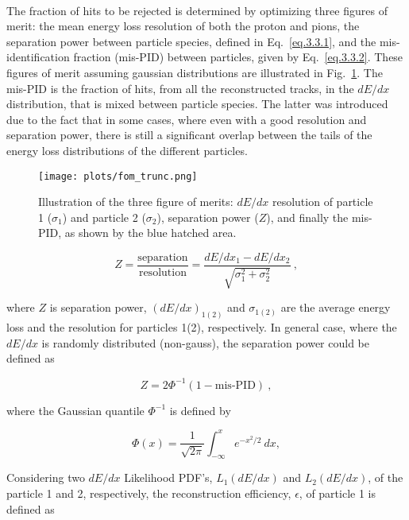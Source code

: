 ~\par The fraction of hits to be rejected is determined by optimizing three figures of merit: the mean energy loss resolution of both the proton and pions, the separation power between particle species, defined in Eq.~\ref{eq.3.3.1}, and the mis-identification fraction (mis-PID) between particles, given by Eq.~\ref{eq.3.3.2}. These figures of merit assuming gaussian distributions are illustrated in Fig.~\ref{fig.3.2.3}. The mis-PID is the fraction of hits, from all the reconstructed tracks, in the $dE/dx$ distribution, that is mixed between particle species. The latter was introduced due to the fact that in some cases, where even with a good resolution and separation power, there is still a significant overlap between the tails of the energy loss distributions of the different particles.

\begin{figure}[H]
    \centering
    \texttt{[image: plots/fom\_trunc.png]}
    \caption{\label{fig.3.2.3} Illustration of the three figure of merits: $dE/dx$ resolution of particle 1 ($\sigma_{1}$) and particle 2 ($\sigma_{2}$), separation power ($Z$), and finally the mis-PID, as shown by the blue hatched area.}
\end{figure}

\begin{equation}
    \label{eq.3.3.1}
    Z = \frac{\mathrm{separation}}{\mathrm{resolution}} = \frac{dE/dx_{1} - dE/dx_{2}}{\sqrt{\sigma_{1}^2 + \sigma_{2}^2}}~,
\end{equation}

\noindent where $Z$ is separation power, $(dE/dx)_{1(2)}$ and $\sigma_{1(2)}$ are the average energy loss and the resolution for particles 1(2), respectively. In general case, where the $dE/dx$ is randomly distributed (non-gauss), the separation power could be defined as 

\begin{equation}
    \label{eq.3.3.2.0.1}
    Z = 2 \Phi^{-1}(1-\mbox{mis-PID})~,
\end{equation}

\noindent where the Gaussian quantile $\Phi^{-1}$ is defined by

\begin{equation}
    \label{eq.3.3.2.0.2}
    \Phi(x) = \frac{1}{\sqrt{2\pi}}\int_{-\infty}^{x} e^{-x^{2}/2}~dx,
\end{equation}

Considering two $dE/dx$ Likelihood PDF's, $L_{1}(dE/dx)$ and $L_{2}(dE/dx)$, of the particle 1 and 2, respectively, the reconstruction efficiency, $\epsilon$, of particle 1 is defined as

